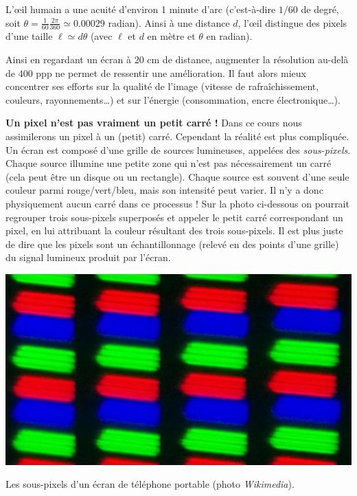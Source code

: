 \documentclass[11pt,class=report,crop=false]{standalone}
\begin{document}
L'\oe il humain a une acuité d'environ 1 minute d'arc (c'est-à-dire $1/60$ de degré,  soit $\theta = \frac1{60}\frac{2\pi}{360} \simeq 0.00029$ radian).
Ainsi à une distance $d$, l'\oe il distingue des pixels d'une taille 
$\ell \simeq d \theta$ (avec $\ell$ et $d$ en mètre et $\theta$ en radian).


Ainsi en regardant un écran à 20 cm de distance, augmenter la résolution au-delà de 400 ppp ne permet de ressentir une amélioration.
Il faut alors mieux concentrer ses efforts sur la qualité de l'image (vitesse de rafraîchissement, couleurs, rayonnements\ldots) et sur l'énergie (consommation, 
encre électronique\ldots).

\bigskip

\textbf{Un pixel n'est pas vraiment un petit carré !}
Dans ce cours nous assimilerons un pixel à un (petit) carré.
Cependant la réalité est plus compliquée.
Un écran est composé d'une grille de sources lumineuses, appelées des \emph{sous-pixels}. Chaque source illumine une petite zone qui n'est pas nécessairement un carré (cela peut être un disque ou un rectangle). Chaque source est souvent d'une seule couleur parmi rouge/vert/bleu, mais son intensité peut varier. Il n'y a donc physiquement aucun carré dans ce processus !
Sur la photo ci-dessous on pourrait regrouper trois sous-pixels superposés et appeler le petit carré correspondant un pixel, en lui attribuant la couleur résultant des trois sous-pixels.
Il est plus juste de dire que les pixels sont un échantillonnage (relevé en des points d'une grille) du signal lumineux produit par l'écran.

\begin{center}
	\includegraphics[scale=\myscale,scale=0.25]{figures/sous-pixels}
	
	Les sous-pixels d'un écran de téléphone portable (photo \emph{Wikimedia}).
\end{center}
\end{document}
